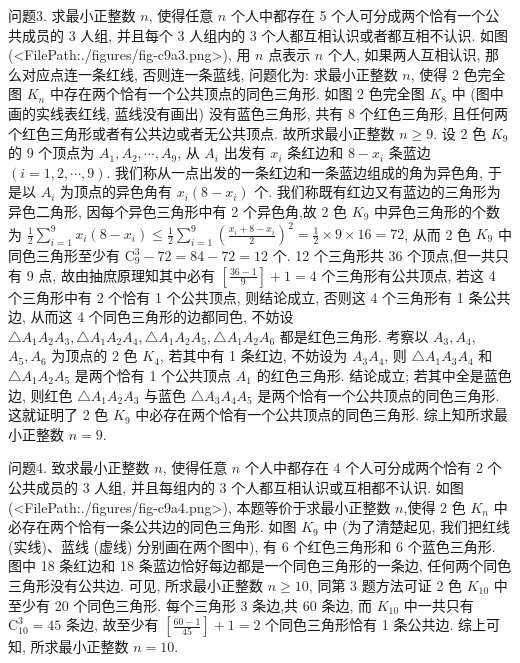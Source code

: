 问题3. 求最小正整数 $n$, 使得任意 $n$ 个人中都存在 5 个人可分成两个恰有一个公共成员的 3 人组, 并且每个 3 人组内的 3 个人都互相认识或者都互相不认识.
如图(<FilePath:./figures/fig-c9a3.png>), 用 $n$ 点表示 $n$ 个人, 如果两人互相认识, 那么对应点连一条红线, 否则连一条蓝线, 问题化为: 求最小正整数 $n$, 使得 2 色完全图 $K_n$ 中存在两个恰有一个公共顶点的同色三角形.
如图 2 色完全图 $K_8$ 中 (图中画的实线表红线, 蓝线没有画出) 没有蓝色三角形, 共有 8 个红色三角形, 且任何两个红色三角形或者有公共边或者无公共顶点.
故所求最小正整数 $n \geqslant 9$. 设 2 色 $K_9$ 的 9 个顶点为 $A_1, A_2, \cdots, A_9$, 从 $A_i$ 出发有 $x_i$ 条红边和 $8-x_i$ 条蓝边 $(i=1,2, \cdots, 9)$. 我们称从一点出发的一条红边和一条蓝边组成的角为异色角, 于是以 $A_i$ 为顶点的异色角有 $x_i\left(8-x_i\right)$ 个.
我们称既有红边又有蓝边的三角形为异色二角形, 因每个异色三角形中有 2 个异色角,故 2 色 $K_9$ 中异色三角形的个数为 $\frac{1}{2} \sum_{i=1}^9 x_i\left(8-x_i\right) \leqslant \frac{1}{2} \sum_{i=1}^9\left(\frac{x_i+8-x_i}{2}\right)^2=\frac{1}{2} \times 9 \times16=72$, 从而 2 色 $K_9$ 中同色三角形至少有 $\mathrm{C}_9^3-72=84-72=12$ 个.
12 个三角形共 36 个顶点,但一共只有 9 点, 故由抽庶原理知其中必有 $\left[\frac{36-1}{9}\right]+1=4$ 个三角形有公共顶点, 若这 4 个三角形中有 2 个恰有 1 个公共顶点, 则结论成立, 否则这 4 个三角形有 1 条公共边, 从而这 4 个同色三角形的边都同色, 不妨设 $\triangle A_1 A_2 A_3, \triangle A_1 A_2 A_4, \triangle A_1 A_2 A_5, \triangle A_1 A_2 A_6$ 都是红色三角形.
考察以 $A_3, A_4$, $A_5, A_6$ 为顶点的 2 色 $K_4$, 若其中有 1 条红边, 不妨设为 $A_3 A_4$, 则 $\triangle A_1 A_3 A_4$ 和 $\triangle A_1 A_2 A_5$ 是两个恰有 1 个公共顶点 $A_1$ 的红色三角形.
结论成立; 若其中全是蓝色边, 则红色 $\triangle A_1 A_2 A_3$ 与蓝色 $\triangle A_3 A_4 A_5$ 是两个恰有一个公共顶点的同色三角形.
这就证明了 2 色 $K_9$ 中必存在两个恰有一个公共顶点的同色三角形.
综上知所求最小正整数 $n=9$.



问题4. 致求最小正整数 $n$, 使得任意 $n$ 个人中都存在 4 个人可分成两个恰有 2 个公共成员的 3 人组, 并且每组内的 3 个人都互相认识或互相都不认识.
如图(<FilePath:./figures/fig-c9a4.png>), 本题等价于求最小正整数 $n$,使得 2 色 $K_n$ 中必存在两个恰有一条公共边的同色三角形.
如图 $K_9$ 中 (为了清楚起见, 我们把红线 (实线)、蓝线 (虚线) 分别画在两个图中), 有 6 个红色三角形和 6 个蓝色三角形.
图中 18 条红边和 18 条蓝边恰好每边都是一个同色三角形的一条边, 任何两个同色三角形没有公共边.
可见, 所求最小正整数 $n \geqslant 10$, 同第 3 题方法可证 2 色 $K_{10}$ 中至少有 20 个同色三角形.
每个三角形 3 条边,共 60 条边, 而 $K_{10}$ 中一共只有 $\mathrm{C}_{10}^3=45$ 条边, 故至少有 $\left[\frac{60-1}{45}\right]+1=2$ 个同色三角形恰有 1 条公共边.
综上可知, 所求最小正整数 $n=10$.



